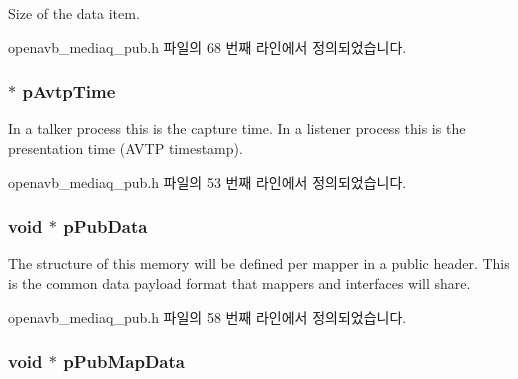 Size of the data item. 



openavb\+\_\+mediaq\+\_\+pub.\+h 파일의 68 번째 라인에서 정의되었습니다.

\subsubsection[{\texorpdfstring{p\+Avtp\+Time}{pAvtpTime}}]{ $\ast$ p\+Avtp\+Time}\hypertarget{structmedia__q__item__t_aa7a475459f9c1a43c64ed85ff1c758cc}{}\label{structmedia__q__item__t_aa7a475459f9c1a43c64ed85ff1c758cc}
In a talker process this is the capture time. In a listener process this is the presentation time (A\+V\+TP timestamp). 

openavb\+\_\+mediaq\+\_\+pub.\+h 파일의 53 번째 라인에서 정의되었습니다.

\subsubsection[{\texorpdfstring{p\+Pub\+Data}{pPubData}}]{\setlength{\rightskip}{0pt plus 5cm}void $\ast$ p\+Pub\+Data}\hypertarget{structmedia__q__item__t_ac27724ac74fd97e91418f1539eccdfb0}{}\label{structmedia__q__item__t_ac27724ac74fd97e91418f1539eccdfb0}
The structure of this memory will be defined per mapper in a public header. This is the common data payload format that mappers and interfaces will share. 

openavb\+\_\+mediaq\+\_\+pub.\+h 파일의 58 번째 라인에서 정의되었습니다.

\subsubsection[{\texorpdfstring{p\+Pub\+Map\+Data}{pPubMapData}}]{\setlength{\rightskip}{0pt plus 5cm}void $\ast$ p\+Pub\+Map\+Data}\hypertarget{structmedia__q__item__t_aa95927d84c1d7409725f2e169b8ec342}{}\label{structmedia__q__item__t_aa95927d84c1d7409725f2e169b8ec342}


